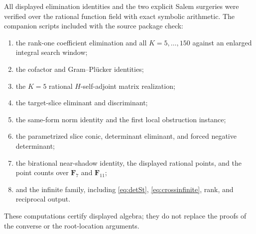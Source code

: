 \documentclass[11pt,reqno]{amsart}
\theoremstyle{definition}
\theoremstyle{remark}
\begin{document}
All displayed elimination identities and the two explicit Salem surgeries
were verified over the rational function field with exact symbolic
arithmetic.  The companion scripts included with the source package check:
\begin{enumerate}[label=\textup{(\arabic*)}]
\item the rank-one coefficient elimination and all $K=5,\ldots,150$ against
an enlarged integral search window;
\item the cofactor and Gram--Pl\"ucker identities;
\item the $K=5$ rational $H$-self-adjoint matrix realization;
\item the target-slice eliminant and discriminant;
\item the same-form norm identity and the first local obstruction instance;
\item the parametrized slice conic, determinant eliminant, and forced
negative determinant;
\item the birational near-shadow identity, the displayed rational points,
and the point counts over $\mathbf F_7$ and $\mathbf F_{11}$;
\item and the infinite family, including \eqref{eq:detSt},
\eqref{eq:crossinfinite}, rank, and reciprocal output.
\end{enumerate}
These computations certify displayed algebra; they do not replace the proofs
of the converse or the root-location arguments.
\end{document}

